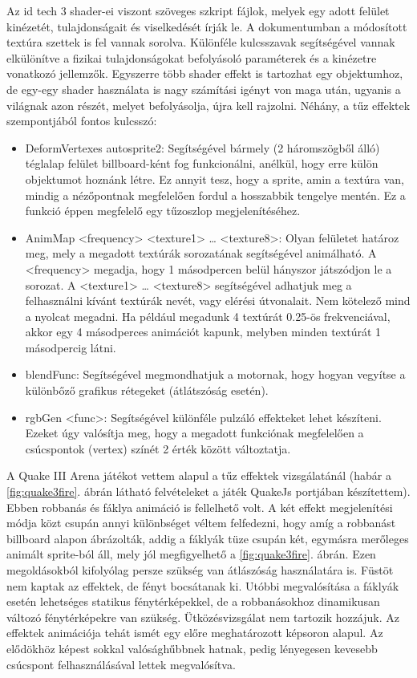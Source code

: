 Az id tech 3 shader-ei viszont szöveges szkript fájlok, melyek egy adott felület kinézetét, tulajdonságait és viselkedését írják le. A dokumentumban a módosított textúra szettek is fel vannak sorolva. Különféle kulcsszavak segítségével vannak elkülönítve a fizikai tulajdonságokat befolyásoló paraméterek és a kinézetre vonatkozó jellemzők. Egyszerre több shader effekt is tartozhat egy objektumhoz, de egy-egy shader használata is nagy számítási igényt von maga után, ugyanis a világnak azon részét, melyet befolyásolja, újra kell rajzolni. \cite{quake3shaderManual} Néhány, a tűz effektek szempontjából fontos kulcsszó: 
\begin{itemize} 
\item
DeformVertexes autosprite2: Segítségével bármely (2 háromszögből álló) téglalap felület billboard-ként fog funkcionálni, anélkül, hogy erre külön objektumot hoznánk létre. Ez annyit tesz, hogy a sprite, amin a textúra van, mindig a nézőpontnak megfelelően fordul a hosszabbik tengelye mentén. Ez a funkció éppen megfelelő egy tűzoszlop megjelenítéséhez.
\item
AnimMap <frequency> <texture1> … <texture8>: Olyan felületet határoz meg, mely a megadott textúrák sorozatának segítségével animálható. A <frequency> megadja, hogy 1 másodpercen belül hányszor játszódjon le a sorozat. A <texture1> … <texture8> segítségével adhatjuk meg a felhasználni kívánt textúrák nevét, vagy elérési útvonalait. Nem kötelező mind a nyolcat megadni. Ha például megadunk 4 textúrát 0.25-ös frekvenciával, akkor egy 4 másodperces animációt kapunk, melyben minden textúrát 1 másodpercig látni. 
\item
blendFunc: Segítségével megmondhatjuk a motornak, hogy hogyan vegyítse a különbőző grafikus rétegeket (átlátszóság esetén).
\item
rgbGen <func>: Segítségével különféle pulzáló effekteket lehet készíteni. Ezeket úgy valósítja meg, hogy a megadott funkciónak megfelelően a csúcspontok (vertex) színét 2 érték között változtatja.
\end{itemize} 
 \cite{quake3shaderManual}

A Quake III Arena játékot vettem alapul a tűz effektek vizsgálatánál (habár a \ref{fig:quake3fire}. ábrán látható felvételeket a játék QuakeJs portjában készítettem). Ebben robbanás és fáklya animáció is fellelhető volt. A két effekt megjelenítési módja közt csupán annyi különbséget véltem felfedezni, hogy amíg a robbanást billboard alapon ábrázolták, addig a fáklyák tüze csupán két, egymásra merőleges animált sprite-ból áll, mely jól megfigyelhető a \ref{fig:quake3fire}. ábrán. Ezen megoldásokból kifolyólag persze szükség van átlászóság használatára is. Füstöt nem kaptak az effektek, de fényt bocsátanak ki. Utóbbi megvalósítása a fáklyák esetén lehetséges statikus fénytérképekkel, de a robbanásokhoz dinamikusan változó fénytérképekre van szükség. Ütközésvizsgálat nem tartozik hozzájuk. Az effektek animációja tehát ismét egy előre meghatározott képsoron alapul. Az elődökhöz képest sokkal valósághűbbnek hatnak, pedig lényegesen kevesebb csúcspont felhasználásával lettek megvalósítva.

